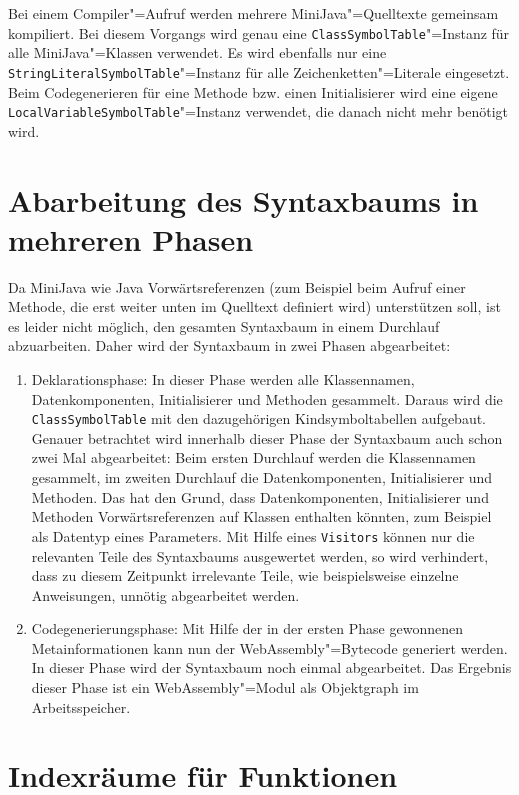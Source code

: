 Bei einem Compiler"=Aufruf werden mehrere MiniJava"=Quelltexte gemeinsam kompiliert. Bei diesem Vorgangs wird genau eine \lstinline{ClassSymbolTable}"=Instanz für alle MiniJava"=Klassen verwendet. Es wird ebenfalls nur eine \lstinline{StringLiteralSymbolTable}"=Instanz für alle Zeichenketten"=Literale eingesetzt. Beim Codegenerieren für eine Methode bzw. einen Initialisierer wird eine eigene \lstinline{LocalVariableSymbolTable}"=Instanz verwendet, die danach nicht mehr benötigt wird.

\section{Abarbeitung des Syntaxbaums in mehreren Phasen}

Da MiniJava wie Java Vorwärtsreferenzen (zum Beispiel beim Aufruf einer Methode, die erst weiter unten im Quelltext definiert wird) unterstützen soll, ist es leider nicht möglich, den gesamten Syntaxbaum in einem Durchlauf abzuarbeiten. Daher wird der Syntaxbaum in zwei Phasen abgearbeitet:

\begin{enumerate}
    \item Deklarationsphase: In dieser Phase werden alle Klassennamen, Datenkomponenten, Initialisierer und Methoden gesammelt. Daraus wird die \lstinline{ClassSymbolTable} mit den dazugehörigen Kindsymboltabellen aufgebaut. Genauer betrachtet wird innerhalb dieser Phase der Syntaxbaum auch schon zwei Mal abgearbeitet: Beim ersten Durchlauf werden die Klassennamen gesammelt, im zweiten Durchlauf die Datenkomponenten, Initialisierer und Methoden. Das hat den Grund, dass Datenkomponenten, Initialisierer und Methoden Vorwärtsreferenzen auf Klassen enthalten könnten, zum Beispiel als Datentyp eines Parameters. Mit Hilfe eines \lstinline{Visitors} können nur die relevanten Teile des Syntaxbaums ausgewertet werden, so wird verhindert, dass zu diesem Zeitpunkt irrelevante Teile, wie beispielsweise einzelne Anweisungen, unnötig abgearbeitet werden.
    \item Codegenerierungsphase: Mit Hilfe der in der ersten Phase gewonnenen Metainformationen kann nun der WebAssembly"=Bytecode generiert werden. In dieser Phase wird der Syntaxbaum noch einmal abgearbeitet. Das Ergebnis dieser Phase ist ein WebAssembly"=Modul als Objektgraph im Arbeitsspeicher.
\end{enumerate}

\section{Indexräume für Funktionen}

